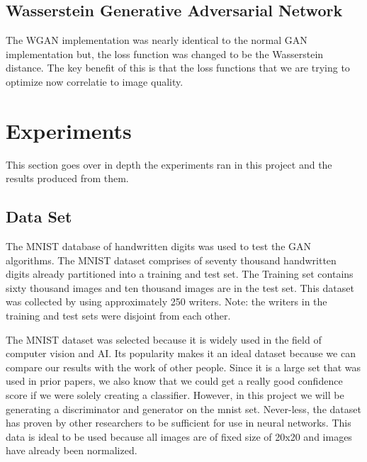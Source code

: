 \documentclass[12pt,
 reprint,
nofootinbib,
 amsmath,amssymb,
 aps,
floatfix,
]{revtex4-2}
\begin{document}
\subsection{\label{sec:impWGAN}Wasserstein Generative Adversarial Network}

The WGAN implementation was nearly identical to the normal GAN implementation but, the loss function was changed to be the Wasserstein distance. The key benefit of this is that the loss functions that we are trying to optimize now correlatie to image quality. 



\section{\label{sec:exp}Experiments}

This section goes over in depth the experiments ran in this project and the results produced from them.


\subsection{\label{sec:dataSet}Data Set}

The MNIST database of handwritten digits was used to test the GAN algorithms. The MNIST dataset comprises of seventy thousand handwritten digits already partitioned into a training and test set. The Training set contains sixty thousand images and ten thousand images are in the test set. This dataset was collected by using approximately 250 writers. Note: the writers in the training and test sets were disjoint from each other.

The MNIST dataset was selected because it is widely used in the field of computer vision and AI. Its popularity makes it an ideal dataset because we can compare our results with the work of other people. Since it is a large set that was used in prior papers, we also know that we could get a really good confidence score if we were solely creating a classifier. However, in this project we will be generating a discriminator and generator on the mnist set. Never-less, the dataset has proven by other researchers to be sufficient for use in neural networks. This  data is ideal to be used because all images are of fixed size of 20x20 and images have already been normalized. 
\end{document}
